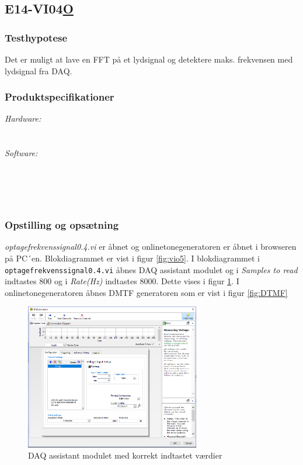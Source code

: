 \subsection{E14-VI04\underline{O}}	
\subsubsection{Testhypotese}
Det er muligt at lave en FFT på et lydsignal og detektere maks. frekvensen med lydsignal fra DAQ.

		\subsubsection{Produktspecifikationer}
	
		\textit{Hardware:}\\
		\PC\\
		\daq\\
	
		\textit{Software:}\\
		\labview\\
		\visa\\
		\vi\\
		\daqsoft\\
		
	
		\subsubsection{Opstilling og opsætning}
		\textit{optagefrekvenssignal0.4.vi} er åbnet og onlinetonegeneratoren er åbnet i browseren på PC´en. Blokdiagrammet er vist i figur \ref{fig:vio5}. I blokdiagrammet i \texttt{optagefrekvenssignal0.4.vi} åbnes DAQ assistant modulet og i \textit{Samples to read} indtastes 800 og i \textit{Rate(Hz)} indtastes 8000. Dette vises i figur \ref{fig:daq}.   
		 I onlinetonegeneratoren åbnes DMTF generatoren som er vist i figur \ref{fig:DTMF}  
		
\begin{figure}[htb]
			\centering
			\includegraphics[width=3in]{DAQassistant}
			\caption{DAQ assistant modulet med korrekt indtastet værdier}
			\label{fig:daq}
		\end{figure}		
		
